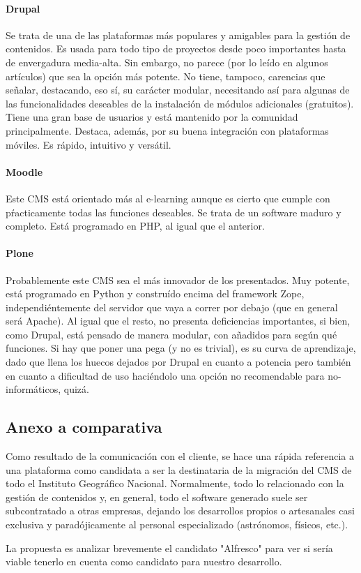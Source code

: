 \paragraph{Drupal}
\par Se trata de una de las plataformas más populares y amigables para la gestión de contenidos. Es usada para todo tipo de proyectos desde poco importantes hasta de envergadura media-alta. Sin embargo, no parece (por lo leído en algunos artículos) que sea la opción más potente.
No tiene, tampoco, carencias que señalar, destacando, eso sí, su carácter modular, necesitando así para algunas de las funcionalidades deseables de la instalación de módulos adicionales (gratuitos). Tiene una gran base de usuarios y está mantenido por la comunidad principalmente. Destaca, además, por su buena integración con plataformas móviles.
Es rápido, intuitivo y versátil.

\paragraph{Moodle}
\par Este CMS está orientado más al e-learning aunque es cierto que cumple con pŕacticamente todas las funciones deseables.
Se trata de un software maduro y completo.
Está programado en PHP, al igual que el anterior.

\paragraph{Plone}
\par Probablemente este CMS sea el más innovador de los presentados. Muy potente, está programado en Python y construído encima del framework Zope, independiéntemente del servidor que vaya a correr por debajo (que en general será Apache).
Al igual que el resto, no presenta deficiencias importantes, si bien, como Drupal, está pensado de manera modular, con añadidos para según qué funciones.
Si hay que poner una pega (y no es trivial), es su curva de aprendizaje, dado que llena los huecos dejados por Drupal en cuanto a potencia pero también en cuanto a dificultad de uso haciéndolo una opción no recomendable para no-informáticos, quizá.

\subsection{Anexo a comparativa}
\par Como resultado de la comunicación con el cliente, se hace una rápida referencia a una plataforma como candidata a ser la destinataria de la migración del CMS de todo el Instituto Geográfico Nacional. Normalmente, todo lo relacionado con la gestión de contenidos y, en general, todo el software generado suele ser subcontratado a otras empresas, dejando los desarrollos propios o artesanales casi exclusiva y paradójicamente al personal especializado (astrónomos, físicos, etc.).
\par La propuesta es analizar brevemente el candidato "Alfresco" para ver si sería viable tenerlo en cuenta como candidato para nuestro desarrollo.
